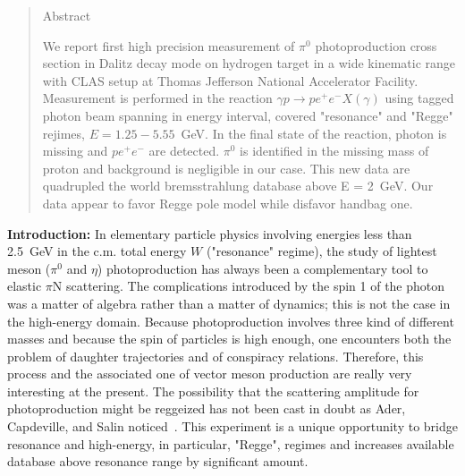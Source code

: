 \documentclass[aps,prc,onecolumn,floatfix,showpacs,preprintnumbers,amsmath,amssymb,superscriptaddress]{revtex4-1}
\begin{document}
\begin{abstract}
\centerline{\Large Abstract}
\vskip 0.2in
We report first high precision measurement of $\pi^0$ 
photoproduction cross section in Dalitz decay mode on 
hydrogen target in a wide kinematic range with CLAS 
setup at Thomas Jefferson National Accelerator Facility. 
Measurement is performed in the reaction $\gamma p\to 
pe^+e^-X(\gamma)$ using tagged photon beam spanning in 
energy interval, covered "resonance" and "Regge" rejimes, 
$E = 1.25-5.55$~GeV. In the final state of the reaction, 
photon is missing and $pe^+e^-$ are detected. $\pi^0$ is 
identified in the missing mass of proton and background
is negligible in our case.  This new data are quadrupled 
the world bremsstrahlung database above E = 2~GeV. Our 
data appear to favor Regge pole model while disfavor 
handbag one.
\end{abstract}

\maketitle

\textbf{Introduction:} In elementary particle physics involving 
energies less than 2.5~GeV in the c.m. total energy $W$ 
("resonance" regime), the study of lightest meson ($\pi^0$ and 
$\eta$) photoproduction has always been a complementary tool to 
elastic $\pi$N scattering. The complications introduced by the 
spin 1 of the photon was a matter of algebra rather than 
a matter of dynamics; this is not the case in the high-energy 
domain. Because photoproduction involves three kind of different 
masses and because the spin of particles is high enough, one 
encounters both the problem of daughter trajectories and of 
conspiracy relations. Therefore, this process and the associated 
one of vector meson production are really very interesting at 
the present. The possibility that the scattering amplitude for 
photoproduction might be reggeized has not been cast in doubt 
as Ader, Capdeville, and Salin noticed~\cite{Ader}.  This 
experiment is a unique opportunity to bridge resonance and 
high-energy, in particular, "Regge", regimes and increases 
available database above resonance range by significant amount.
\end{document}
